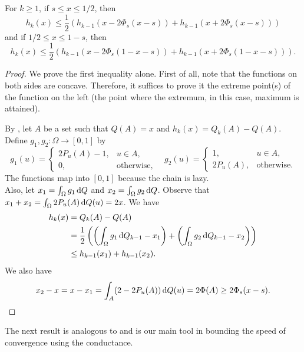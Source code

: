 \begin{theorem}
For $k\geq 1$, if $s\leq x\leq 1/2$, then
\[ h_k(x) \leq \frac{1}{2} \left(h_{k-1}(x-2\Phi_s(x-s)) + h_{k-1}(x+2\Phi_s(x-s))\right) \]
and if $1/2 \leq x\leq 1-s$, then
\[ h_k(x) \leq \frac{1}{2} \left(h_{k-1}(x-2\Phi_s(1-x-s)) + h_{k-1}(x+2\Phi_s(1-x-s))\right). \]
\end{theorem}
\begin{proof}
We prove the first inequality alone. First of all, note that the functions on both sides are concave.
Therefore, it suffices to prove it the extreme point(s) of the function on the left (the point where the extremum, in this case, maximum is attained). 

By , let $A$ be a set such that $Q(A)=x$ and $h_k(x)=Q_k(A)-Q(A)$. Define $g_1,g_2:\Omega\to[0,1]$ by
\[ g_1(u) = 
\begin{cases}
2P_u(A) - 1, & u\in A, \\
0, & \text{otherwise,}
\end{cases}
\quad
g_2(u) = 
\begin{cases}
1, & u\in A, \\
2P_u(A), & \text{otherwise.}
\end{cases}
\]
The functions map into $[0,1]$ because the chain is lazy.\\
Also, let $x_1 = \int_\Omega g_1\operatorname{d}\!{Q}$ and $x_2 = \int_\Omega g_2\operatorname{d}\!{Q}$. Observe that $x_1 + x_2 = \int_\Omega 2P_u(A)\operatorname{d}\!{Q}(u) = 2x$. We have
\begin{align*}
    h_k(x) &= Q_k(A) - Q(A) \\
    &= \frac{1}{2} \left( \left(\int_\Omega g_1\operatorname{d}\!{Q}_{k-1} - x_1\right) + \left( \int_\Omega g_2\operatorname{d}\!{Q}_{k-1} - x_2 \right) \right) \\
    &\leq h_{k-1}(x_1) + h_{k-1}(x_2).
\end{align*}
We also have
\[ x_2-x = x-x_1 = \int_A (2-2P_u(A))\operatorname{d}\!{Q}(u) = 2\Phi(A) \geq 2\Phi_s(x-s). \]
\end{proof}

The next result is analogous to  and is our main tool in bounding the speed of convergence using the conductance.

